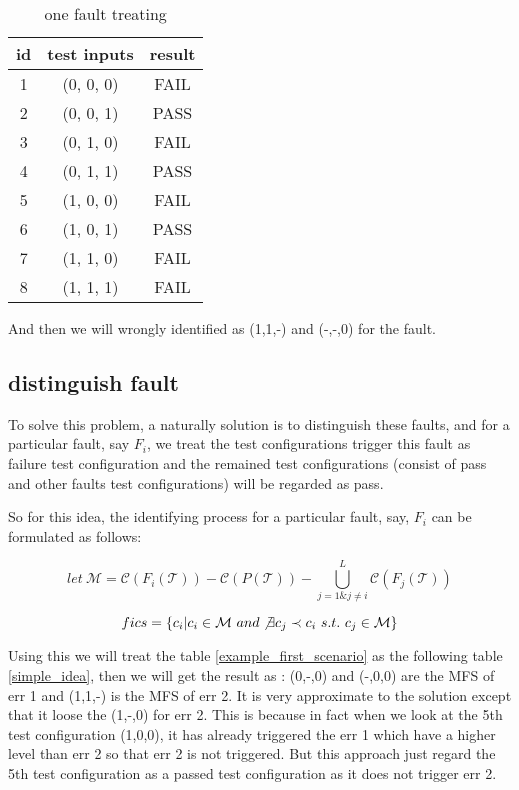 \documentclass{sig-alternate}
\begin{document}
\begin{table}
\centering
\caption{one fault treating}
\label{previous_work}
\begin{tabular}{|c|c|c|} \hline
id&test inputs & result\\ \hline
1&(0, 0, 0) &  FAIL\\ \hline
2&(0, 0, 1) &  PASS\\ \hline
3&(0, 1, 0) &  FAIL\\ \hline
4&(0, 1, 1) &  PASS\\ \hline
5&(1, 0, 0) &  FAIL\\ \hline
6&(1, 0, 1) &  PASS\\ \hline
7&(1, 1, 0) &  FAIL\\ \hline
8&(1, 1, 1) &  FAIL\\ \hline
\hline\end{tabular}
\end{table}

And then we will wrongly identified as (1,1,-) and (-,-,0) for the fault.

\subsection{distinguish fault}

To solve this problem, a naturally solution is to distinguish these faults, and for a particular fault, say $F_{i}$, we treat the test configurations trigger this fault as failure test configuration and the remained test configurations (consist of pass and other faults test configurations) will be regarded as pass.

So for this idea, the identifying process for a particular fault, say, $F_{i}$ can be formulated as follows:

$$let\ \mathcal{M} = \mathcal{C}(F_{i}(\mathcal{T})) - \mathcal{C}(P(\mathcal{T})) - \bigcup_{j = 1 \& j \neq i }^{L}\mathcal{C}(F_{j}(\mathcal{T}))$$

$$fics = \{c_{i} | c_{i} \in \mathcal{M} \ and \not\exists c_{j} \prec c_{i}\ s.t.\ c_{j} \in \mathcal{M} \}$$

Using this we will treat the table \ref{example_first_scenario} as the following table \ref{simple_idea}, then we will get the result as : (0,-,0) and (-,0,0) are the MFS of err 1 and (1,1,-) is the MFS of err 2. It is very approximate to the solution except that it loose the (1,-,0) for err 2. This is because in fact when we look at the 5th test configuration (1,0,0), it has already triggered the err 1 which have a higher level than err 2 so that err 2 is not triggered. But this approach just regard the 5th test configuration as a passed test configuration as it does not trigger err 2.
\end{document}
